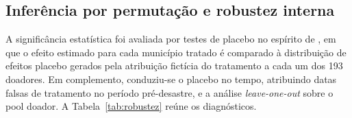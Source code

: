 \documentclass[a4paper,12pt]{article}
\begin{document}
\subsection{Inferência por permutação e robustez interna}
\label{sub:robustez}

A significância estatística foi avaliada por testes de placebo no espírito
de , em que o efeito estimado para cada município
tratado é comparado à distribuição de efeitos placebo gerados pela atribuição
fictícia do tratamento a cada um dos 193 doadores. Em complemento, conduziu-se
o placebo no tempo, atribuindo datas falsas de tratamento no período
pré-desastre, e a análise \textit{leave-one-out} sobre o pool doador. A
Tabela~\ref{tab:robustez} reúne os diagnósticos.
\end{document}
